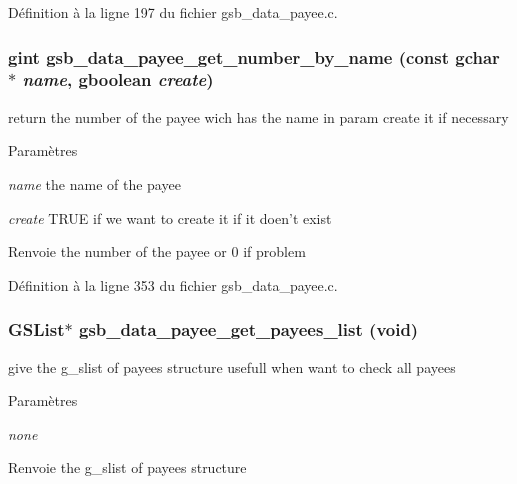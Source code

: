 Définition à la ligne 197 du fichier gsb\_\-data\_\-payee.c.

\subsubsection[{gsb\_\-data\_\-payee\_\-get\_\-number\_\-by\_\-name}]{\setlength{\rightskip}{0pt plus 5cm}gint gsb\_\-data\_\-payee\_\-get\_\-number\_\-by\_\-name (const gchar $\ast$ {\em name}, \/  gboolean {\em create})}\label{gsb__data__payee_8c_a0841102ff1dc4d499187b11a187fe92d}
return the number of the payee wich has the name in param create it if necessary


\begin{DoxyParams}{Paramètres}
\item[{\em name}]the name of the payee \item[{\em create}]TRUE if we want to create it if it doen't exist\end{DoxyParams}
\begin{DoxyReturn}{Renvoie}
the number of the payee or 0 if problem 
\end{DoxyReturn}


Définition à la ligne 353 du fichier gsb\_\-data\_\-payee.c.

\subsubsection[{gsb\_\-data\_\-payee\_\-get\_\-payees\_\-list}]{\setlength{\rightskip}{0pt plus 5cm}GSList$\ast$ gsb\_\-data\_\-payee\_\-get\_\-payees\_\-list (void)}\label{gsb__data__payee_8c_a2fe0b4b22dcae74be865456e5f7c9995}
give the g\_\-slist of payees structure usefull when want to check all payees


\begin{DoxyParams}{Paramètres}
\item[{\em none}]\end{DoxyParams}
\begin{DoxyReturn}{Renvoie}
the g\_\-slist of payees structure 
\end{DoxyReturn}


